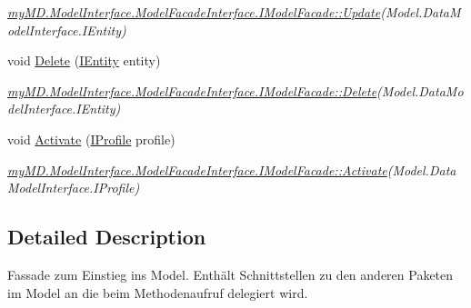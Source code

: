 \begin{CompactItemize}
\begin{CompactList}\small\item\em \hyperlink{interfacemy_m_d_1_1_model_interface_1_1_model_facade_interface_1_1_i_model_facade_bf510dc6cf79d153f564eca0f10971d2}{my\-MD.Model\-Interface.Model\-Facade\-Interface.IModel\-Facade::Update}(Model.Data\-Model\-Interface.IEntity) \item\end{CompactList}\item 
\hypertarget{classmy_m_d_1_1_model_1_1_model_facade_1_1_model_facade_1ec3022b27f9091440cb495f510d25b0}{
void \hyperlink{classmy_m_d_1_1_model_1_1_model_facade_1_1_model_facade_1ec3022b27f9091440cb495f510d25b0}{Delete} (\hyperlink{interfacemy_m_d_1_1_model_interface_1_1_data_model_interface_1_1_i_entity}{IEntity} entity)}
\label{d5/dc0/classmy_m_d_1_1_model_1_1_model_facade_1_1_model_facade_1ec3022b27f9091440cb495f510d25b0}

\begin{CompactList}\small\item\em \hyperlink{interfacemy_m_d_1_1_model_interface_1_1_model_facade_interface_1_1_i_model_facade_1ec3022b27f9091440cb495f510d25b0}{my\-MD.Model\-Interface.Model\-Facade\-Interface.IModel\-Facade::Delete}(Model.Data\-Model\-Interface.IEntity) \item\end{CompactList}\item 
\hypertarget{classmy_m_d_1_1_model_1_1_model_facade_1_1_model_facade_6ffa7bbff9bc4db881433251a158fbd0}{
void \hyperlink{classmy_m_d_1_1_model_1_1_model_facade_1_1_model_facade_6ffa7bbff9bc4db881433251a158fbd0}{Activate} (\hyperlink{interfacemy_m_d_1_1_model_interface_1_1_data_model_interface_1_1_i_profile}{IProfile} profile)}
\label{d5/dc0/classmy_m_d_1_1_model_1_1_model_facade_1_1_model_facade_6ffa7bbff9bc4db881433251a158fbd0}

\begin{CompactList}\small\item\em \hyperlink{interfacemy_m_d_1_1_model_interface_1_1_model_facade_interface_1_1_i_model_facade_6ffa7bbff9bc4db881433251a158fbd0}{my\-MD.Model\-Interface.Model\-Facade\-Interface.IModel\-Facade::Activate}(Model.Data\-Model\-Interface.IProfile) \item\end{CompactList}\end{CompactItemize}


\subsection{Detailed Description}
Fassade zum Einstieg ins Model. Enth\"{a}lt Schnittstellen zu den anderen Paketen im Model an die beim Methodenaufruf delegiert wird. 


